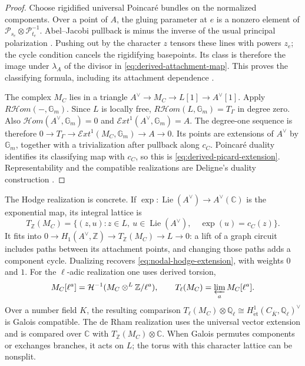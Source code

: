 \documentclass[11pt]{article}
\theoremstyle{definition}
\theoremstyle{remark}
\newcommand{\Q}{\mathbb Q}
\newcommand{\Z}{\mathbb Z}
\newcommand{\C}{\mathbb C}
\begin{document}
\begin{proof}
Choose rigidified universal Poincar\'{e} bundles on the normalized
components. Over a point of $A$, the gluing parameter at $e$ is a nonzero
element of $\mathcal P_{s_e}\otimes\mathcal P_{t_e}^{-1}$.
Abel--Jacobi pullback is minus the inverse of the usual principal
polarization \cite[Lemma 6.9 and Summary 6.11]{MilneJacobianVarieties}.
Pushing out by the character $z$ tensors these lines with powers $z_e$;
the cycle condition cancels the rigidifying basepoints. Its class is
therefore the image under $\lambda_A$ of the divisor in
\eqref{eq:derived-attachment-map}. This proves the classifying
formula, including its attachment dependence
\cite[\S3.0--3.1.1]{CaporasoVivianiStableTorelli}.

The complex $M_C$ lies in a triangle
$A^\vee\to M_C\to L[1]\to A^\vee[1]$.
Apply $R\mathcal Hom(-,\mathbb G_m)$. Since $L$ is locally free,
$R\mathcal Hom(L,\mathbb G_m)=T_\Gamma$ in degree zero. Also
$\mathcal Hom(A^\vee,\mathbb G_m)=0$ and
$\mathcal Ext^1(A^\vee,\mathbb G_m)=A$. The degree-one sequence is
therefore $0\to T_\Gamma\to\mathcal Ext^1(M_C,\mathbb G_m)\to A\to0$.
Its points are extensions of $A^\vee$ by $\mathbb G_m$, together with a
trivialization after pullback along $c_C$. Poincar\'{e} duality identifies
its classifying map with $c_C$, so this is \eqref{eq:derived-picard-extension}.
Representability and the compatible realizations are Deligne's duality
construction \cite[\S10.2.10--10.2.13, \S10.3]{DeligneHodgeIII}.
\end{proof}

The Hodge realization is concrete. If $\exp:\operatorname{Lie}(A^\vee)
\to A^\vee(\C)$ is the exponential map, its integral lattice is
\[
 T_\Z(M_C)=\{(z,u):z\in L,\ u\in\operatorname{Lie}(A^\vee),\quad
                         \exp(u)=c_C(z)\}.
\]
It fits into $0\to H_1(A^\vee,\Z)\to T_\Z(M_C)\to L\to0$:
a lift of a graph circuit includes paths between its attachment points,
and changing those paths adds a component cycle. Dualizing recovers
\eqref{eq:nodal-hodge-extension}, with weights $0$ and $1$.
For the $\ell$-adic realization one uses derived torsion,
\[
 M_C[\ell^a]=\mathcal H^{-1}(M_C\otimes^L\Z/\ell^a),\qquad
 T_\ell(M_C)=\varprojlim_a M_C[\ell^a].
\]
Over a number field $K$, the resulting comparison
$T_\ell(M_C)\otimes\Q_\ell\cong
H^1_{\mathrm{\acute et}}(C_{\overline K},\Q_\ell)^\vee$
is Galois compatible. The de Rham realization uses the universal vector
extension and is compared over $\C$ with $T_\Z(M_C)\otimes\C$.
When Galois permutes components or exchanges branches, it acts on $L$;
the torus with this character lattice can be nonsplit.
\end{document}
